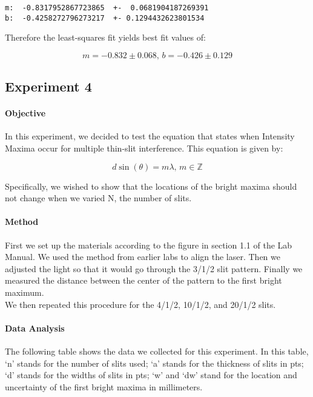 \documentclass[11pt]{article}
\begin{document}
    \begin{Verbatim}[commandchars=\\\{\}]
m:  -0.8317952867723865  +-  0.0681904187269391
b:  -0.4258272796273217  +- 0.1294432623801534
\end{Verbatim}

    Therefore the least-squares fit yields best fit values of:

\[\boxed{m = -0.832 \pm 0.068 \text{, } b = -0.426 \pm 0.129}\]

    \hypertarget{experiment-4}{%
\subsection{Experiment 4}\label{experiment-4}}

\hypertarget{objective}{%
\paragraph{Objective}\label{objective}}

In this experiment, we decided to test the equation that states when
Intensity Maxima occur for multiple thin-slit interference. This
equation is given by:

\[d\sin(\theta) = m\lambda\text{, }m\in \mathbb{Z}\]

Specifically, we wished to show that the locations of the bright maxima
should not change when we varied N, the number of slits.

\hypertarget{method}{%
\paragraph{Method}\label{method}}

First we set up the materials according to the figure in section 1.1 of
the Lab Manual. We used the method from earlier labs to align the laser.
Then we adjusted the light so that it would go through the 3/1/2 slit
pattern. Finally we measured the distance between the center of the
pattern to the first bright maximum. \\

We then repeated this procedure for the 4/1/2, 10/1/2, and 20/1/2 slits.

\hypertarget{data-analysis}{%
\paragraph{Data Analysis}\label{data-analysis}}

The following table shows the data we collected for this experiment. In
this table, `n' stands for the number of slits used; `a' stands for the
thickness of slits in pts; `d' stands for the widths of slits in pts;
`w' and `dw' stand for the location and uncertainty of the first bright
maxima in millimeters.
\end{document}
